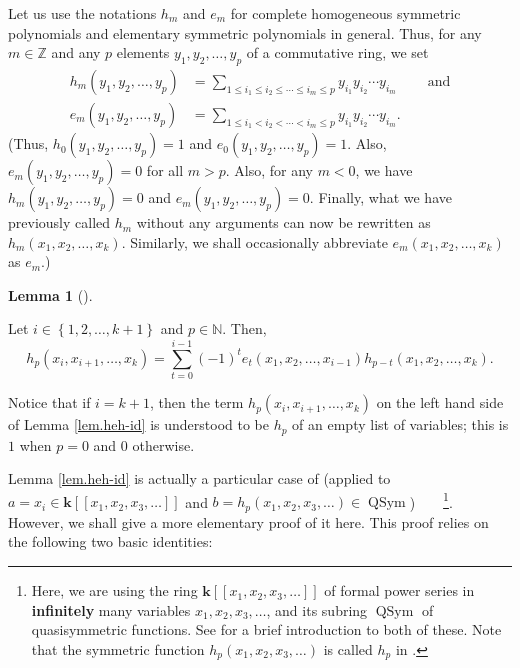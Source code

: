 \documentclass[numbers=enddot,12pt,final,onecolumn,notitlepage]{scrartcl}%
\theoremstyle{definition}
\newtheorem{lem}[theo]{Lemma}
\newenvironment{lemma}[1][]
{\begin{lem}[#1]\begin{leftbar}}
{\end{leftbar}\end{lem}}
\let\sumnonlimits\sum
\renewcommand{\sum}{\sumnonlimits\limits}
\begin{document}
Let us use the notations $h_{m}$ and $e_{m}$ for complete homogeneous
symmetric polynomials and elementary symmetric polynomials in general. Thus,
for any $m\in\mathbb{Z}$ and any $p$ elements $y_{1},y_{2},\ldots,y_{p}$ of a
commutative ring, we set%
\begin{align}
h_{m}\left(  y_{1},y_{2},\ldots,y_{p}\right)   &  =\sum_{1\leq i_{1}\leq
i_{2}\leq\cdots\leq i_{m}\leq p}y_{i_{1}}y_{i_{2}}\cdots y_{i_{m}%
}\ \ \ \ \ \ \ \ \ \ \text{and}\label{eq.def.hm}\\
e_{m}\left(  y_{1},y_{2},\ldots,y_{p}\right)   &  =\sum_{1\leq i_{1}%
<i_{2}<\cdots<i_{m}\leq p}y_{i_{1}}y_{i_{2}}\cdots y_{i_{m}}.
\label{eq.def.em}%
\end{align}
(Thus, $h_{0}\left(  y_{1},y_{2},\ldots,y_{p}\right)  =1$ and $e_{0}\left(
y_{1},y_{2},\ldots,y_{p}\right)  =1$. Also, $e_{m}\left(  y_{1},y_{2}%
,\ldots,y_{p}\right)  =0$ for all $m>p$. Also, for any $m<0$, we have
$h_{m}\left(  y_{1},y_{2},\ldots,y_{p}\right)  =0$ and $e_{m}\left(
y_{1},y_{2},\ldots,y_{p}\right)  =0$. Finally, what we have previously called
$h_{m}$ without any arguments can now be rewritten as $h_{m}\left(
x_{1},x_{2},\ldots,x_{k}\right)  $. Similarly, we shall occasionally
abbreviate $e_{m}\left(  x_{1},x_{2},\ldots,x_{k}\right)  $ as $e_{m}$.)

\begin{lemma}
\label{lem.heh-id}Let $i\in\left\{  1,2,\ldots,k+1\right\}  $ and
$p\in\mathbb{N}$. Then,%
\[
h_{p}\left(  x_{i},x_{i+1},\ldots,x_{k}\right)  =\sum_{t=0}^{i-1}\left(
-1\right)  ^{t}e_{t}\left(  x_{1},x_{2},\ldots,x_{i-1}\right)  h_{p-t}\left(
x_{1},x_{2},\ldots,x_{k}\right)  .
\]

\end{lemma}

Notice that if $i=k+1$, then the term $h_{p}\left(  x_{i},x_{i+1},\ldots
,x_{k}\right)  $ on the left hand side of Lemma \ref{lem.heh-id} is understood
to be $h_{p}$ of an empty list of variables; this is $1$ when $p=0$ and $0$ otherwise.

Lemma \ref{lem.heh-id} is actually a particular case of \cite[detailed
version, Theorem 3.15]{dimcr} (applied to $a=x_{i}\in\mathbf{k}\left[  \left[
x_{1},x_{2},x_{3},\ldots\right]  \right]  $ and $b=h_{p}\left(  x_{1}%
,x_{2},x_{3},\ldots\right)  \in\operatorname*{QSym}$)\ \ \ \ \footnote{Here,
we are using the ring $\mathbf{k}\left[  \left[  x_{1},x_{2},x_{3}%
,\ldots\right]  \right]  $ of formal power series in \textbf{infinitely} many
variables $x_{1},x_{2},x_{3},\ldots$, and its subring $\operatorname*{QSym}$
of quasisymmetric functions. See \cite{dimcr} for a brief introduction to both
of these. Note that the symmetric function $h_{p}\left(  x_{1},x_{2}%
,x_{3},\ldots\right)  $ is called $h_{p}$ in \cite{dimcr}.}. However, we shall
give a more elementary proof of it here. This proof relies on the following
two basic identities:
\end{document}
